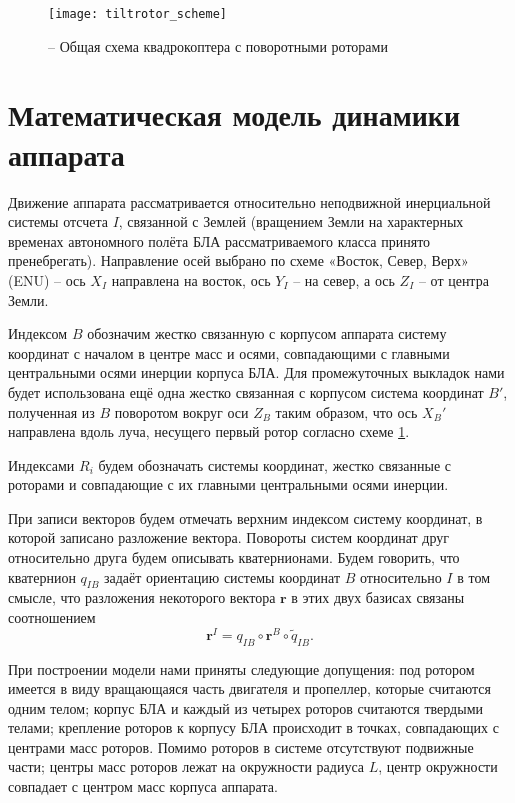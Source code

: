\begin{figure}[h]
	\centering
	\texttt{[image: tiltrotor\_scheme]}
	\caption{ -- Общая схема квадрокоптера с поворотными роторами}
	\label{fig:tiltrotor_scheme}
\end{figure}

\section{Математическая модель динамики аппарата}
Движение аппарата рассматривается относительно неподвижной инерциальной системы отсчета $I$, связанной с Землей (вращением Земли на характерных временах автономного полёта БЛА рассматриваемого класса принято пренебрегать).
Направление осей выбрано по схеме «Восток, Север, Верх» (ENU) -- ось \textbf{$X_I$} направлена на восток, ось \textbf{$Y_I$} -- на север, а ось \textbf{$Z_I$} -- от центра Земли.

Индексом $B$ обозначим жестко связанную с корпусом аппарата систему координат с началом в центре масс и осями, совпадающими с главными центральными осями инерции корпуса БЛА.
Для промежуточных выкладок нами будет использована ещё одна жестко связанная с корпусом система координат $B'$, полученная из $B$ поворотом вокруг оси $Z_B$ таким образом, что ось $X_B'$ направлена вдоль луча, несущего первый ротор согласно схеме \ref{fig:tiltrotor_scheme}.

Индексами $R_i$ будем обозначать системы координат, жестко связанные с роторами и совпадающие с их главными центральными осями инерции.

При записи векторов будем отмечать верхним индексом систему координат, в которой записано разложение вектора. Повороты систем координат друг относительно друга будем описывать кватернионами. Будем говорить, что кватернион $q_{IB}$ задаёт ориентацию системы координат $B$ относительно $I$ в том смысле, что разложения некоторого вектора $\bm{r}$ в этих двух базисах связаны соотношением
\begin{equation} \label{eq:m_quat}
\bm{r}^I = q_{IB} \circ \bm{r}^B \circ \tilde{q}_{IB}.
\end{equation}

При построении модели нами приняты следующие допущения: под ротором имеется в виду вращающаяся часть двигателя и пропеллер, которые считаются одним телом; корпус БЛА и каждый из четырех роторов считаются твердыми телами; крепление роторов к корпусу БЛА происходит в точках, совпадающих с центрами масс роторов. Помимо роторов в системе отсутствуют подвижные части; центры масс роторов лежат на окружности радиуса $L$, центр окружности совпадает с центром масс корпуса аппарата.

